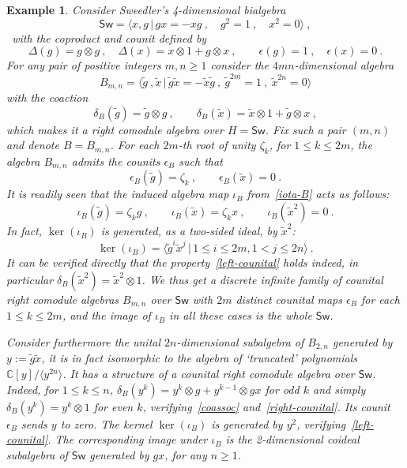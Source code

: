 \documentclass[11pt]{amsart}
\numberwithin{equation}{section}
\newtheorem{example}[thm]{Example}
\numberwithin{equation}{section}
\begin{document}
\begin{example}\label{ex:Sw}
   Consider Sweedler's 4-dimensional bialgebra
\[ \mathsf{Sw} = \bigl\langle x,g \, \big|\,  gx = -xg\ , \quad g^2 = 1\ , \quad x^2 = 0 \bigr\rangle\ , \]\  
with the coproduct and counit
defined by
\begin{equation*}
\Delta(g) = g \otimes g\ , \quad 
\Delta(x) = x \otimes 1 + g \otimes x\ ,\qquad
\epsilon(g) = 1\ , \quad \epsilon(x) = 0\ .
\end{equation*}
For any pair of positive integers $m,n \geq 1$ consider the $4mn$-dimensional algebra
\[ B_{m,n} = \bigl\langle \tilde{g}\ , \tilde{x} \, \big|\, \tilde{g}\tilde{x} = -\tilde{x}\tilde{g}\ , \: \tilde{g}^{2m} = 1\ , \: \tilde{x}^{2n} = 0 \bigr\rangle \]
with the coaction
$$
\delta_B(\tilde{g}) = \tilde{g} \otimes g\ ,\qquad
\delta_B(\tilde{x}) = \tilde{x}\otimes1 + \tilde{g}\otimes x\ ,
$$
which makes it a right comodule algebra over $H=\mathsf{Sw}$.
Fix such a pair $(m,n)$ and denote $B=B_{m,n}$. For each $2m$-th root of unity $\zeta_k$,  for $1\leq k \leq 2m$, the algebra $B_{m,n}$ admits the counits  $\epsilon_B$ such that
$$
\epsilon_B(\tilde{g}) = \zeta_k\ , \qquad \epsilon_B(\tilde{x})=0\ .
$$
It is readily seen that the induced algebra map $\iota_B$ from~\eqref{iota-B} acts as follows:
$$
\iota_B(\tilde{g}) = \zeta_k g\ , \qquad \iota_B(\tilde{x})= \zeta_k x\ ,
\qquad \iota_B(\tilde{x}^2)=0\ .
$$ 
 In fact,  $\ker(\iota_B)$ is generated, as a two-sided ideal, by $\tilde{x}^2$:
$$
\ker(\iota_B) = \bigl\langle \tilde{g}^i \tilde{x}^j \, \big|\, 1\leq i \leq 2m, 1 < j \leq 2n \bigr\rangle \ .
$$
It can be verified directly that the property~\eqref{left-counital} holds indeed, in particular $\delta_B(\tilde{x}^2) = \tilde{x}^2\otimes 1$. We thus get a discrete infinite family of counital right comodule algebras $B_{m,n}$ over $\mathsf{Sw}$ with $2m$ distinct counital maps $\epsilon_B$ for each $1\leq k\leq 2m$, and the image of $\iota_B$ in all these cases is the whole $\mathsf{Sw}$.  

Consider furthermore the unital $2n$-dimensional subalgebra of $B_{2,n}$ generated by $y:=\tilde{g}\tilde{x}$, it is in fact isomorphic to the algebra of `truncated' polynomials $\mathbb{C}[y]/\langle y^{2n}\rangle$. It has a structure of a counital right comodule algebra over $\mathsf{Sw}$. Indeed, for $1\leq k\leq n$, $\delta_B(y^k) = y^k\otimes g + y^{k-1} \otimes gx$ for odd $k$ and simply $\delta_B(y^k) = y^k\otimes 1$ for even $k$, verifying~\eqref{coassoc} and~\eqref{right-counital}. Its counit $\epsilon_B$ sends $y$ to zero. The kernel $\ker(\iota_B)$ is generated by $y^2$, verifying~\eqref{left-counital}. The corresponding image under $\iota_B$ is the 2-dimensional  coideal subalgebra of $\mathsf{Sw}$ generated by $gx$, for any $n\geq1$.
\end{example}
\end{document}

